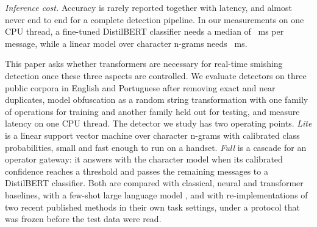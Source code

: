 \emph{Inference cost.} Accuracy is rarely reported together with latency, and almost never end to end for a complete detection pipeline. In our measurements on one CPU thread, a fine-tuned DistilBERT classifier needs a median of ~ms per message, while a linear model over character n-grams needs ~ms.

This paper asks whether transformers are necessary for real-time smishing detection once these three aspects are controlled. We evaluate detectors on three public corpora in English and Portuguese after removing exact and near duplicates, model obfuscation as a random string transformation with one family of operations for training and another family held out for testing, and measure latency on one CPU thread. The detector we study has two operating points. \emph{Lite} is a linear support vector machine over character n-grams with calibrated class probabilities, small and fast enough to run on a handset. \emph{Full} is a cascade for an operator gateway: it answers with the character model when its calibrated confidence reaches a threshold and passes the remaining messages to a DistilBERT classifier. Both are compared with classical, neural and transformer baselines, with a few-shot large language model \cite{qwen2024}, and with re-implementations of two recent published methods \cite{mahmud2024,shim2024} in their own task settings, under a protocol that was frozen before the test data were read.

